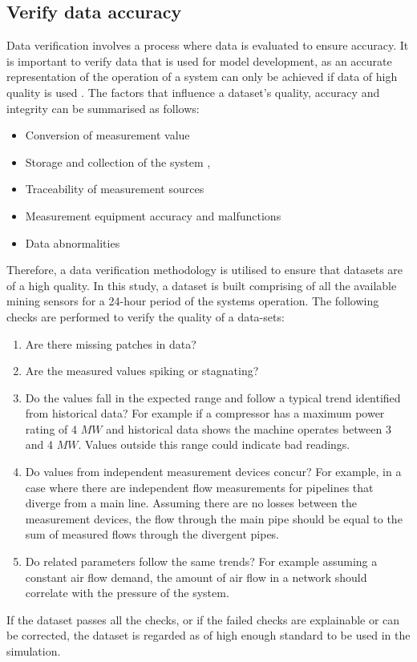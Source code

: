 	\subsection{Verify data accuracy}
	Data verification involves a process where data is evaluated to ensure accuracy. It is important to verify data that is used for model development, as an accurate representation of the operation of a system can only be achieved if data of high quality is used \cite{gous2016data}. The factors that influence a dataset's quality, accuracy and integrity can be summarised as follows:
	\begin{itemize}
		\item Conversion of measurement value \cite{meijsen2015verification}
		\item Storage and collection of the system \cite{vanNiekerk2016quantification}, \cite{Jansevan2016structuring}
		\item Traceability of measurement sources \cite{Jansevan2016structuring}
		\item Measurement equipment accuracy and malfunctions \cite{gous2016data}
		\item Data abnormalities \cite{gous2016data}
	\end{itemize} 
	\par 
	Therefore, a data verification methodology is utilised to ensure that datasets are of a high quality. In this study, a dataset is built comprising of all the available mining sensors for a 24-hour period of the systems operation. The following checks are performed to verify the quality of a data-sets:
	\begin{enumerate}
		\item Are there missing patches in data?
		\item Are the measured values spiking or stagnating?
		\item Do the values fall in the expected range and follow a typical trend identified from historical data? For example if a compressor has a maximum power rating of 4 $MW$ and historical data shows the machine operates between 3 and 4 $MW$. Values outside this range could indicate bad readings.
		\item Do values from independent measurement devices concur? For example, in a case where there are independent flow measurements for pipelines that diverge from a main line. Assuming there are no losses between the measurement devices, the flow through the main pipe should be equal to the sum of measured flows through the divergent pipes.
		\item Do related parameters follow the same trends? For example assuming a constant air flow demand, the amount of air flow in a network should correlate with the pressure of the system.
	\end{enumerate} 
If the dataset passes all the checks, or if the failed checks are explainable or can be corrected, the dataset is regarded as of high enough standard to be used in the simulation.

